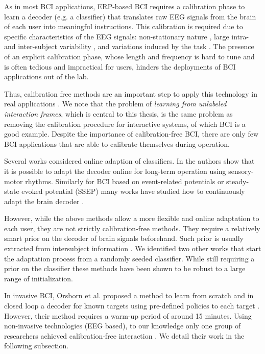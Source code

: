 As in most BCI applications, ERP-based BCI requires a calibration phase to learn a decoder (e.g. a classifier) that translates raw EEG signals from the brain of each user into meaningful instructions. This calibration is required due to specific characteristics of the EEG signals: non-stationary nature \cite{vidaurre11}, large intra- and inter-subject variability \cite{Polich1997}, and variations induced by the task \cite{iturrate2013task}. The presence of an explicit calibration phase, whose length and frequency is hard to tune and is often tedious and impractical for users, hinders the deployments of BCI applications out of the lab. 

Thus, calibration free methods are an important step to apply this technology in real applications \cite{millan10}. We note that the problem of \emph{learning from unlabeled interaction frames}, which is central to this thesis, is the same problem as removing the calibration procedure for interactive systems, of which BCI is a good example. Despite the importance of calibration-free BCI, there are only few BCI applications that are able to calibrate themselves during operation.

Several works considered online adaption of classifiers. In \cite{vidaurre2010towards} the authors show that it is possible to adapt the decoder online for long-term operation using sensory-motor rhythms. Similarly for BCI based on
event-related potentials or steady-state evoked potential (SSEP) many works have studied how to continuously adapt the brain decoder \cite{fazli2009subject,lu2009unsupervised,fazli2011l1,congedo2013new,schettini2014self}.

However, while the above methods allow a more flexible and online adaptation to each user, they are not strictly calibration-free methods. They require a relatively smart prior on the decoder of brain signals beforehand. Such prior is usually extracted from intersubject information \cite{fazli2009subject,lu2009unsupervised,vidaurre2010towards}. We identified two other works that start the adaptation process from a randomly seeded classifier. While still requiring a prior on the classifier these methods have been shown to be robust to a large range of initialization.

In invasive BCI, Orsborn et al. proposed a method to learn from scratch and in closed loop a decoder for known targets using pre-defined policies to each target \cite{Orsborn2012}. However, their method requires a warm-up period of around 15 minutes. Using non-invasive technologies (EEG based), to our knowledge only one group of researchers achieved calibration-free interaction \cite{Kindermans2012a,kindermans2014true}. We detail their work in the following subsection.

